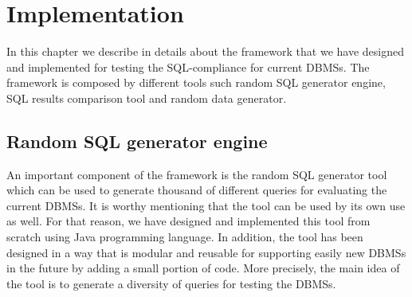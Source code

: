 \chapter{Implementation}
In this chapter we describe in details about the framework that we have designed and implemented for testing the SQL-compliance for current DBMSs. The framework is composed by different tools such random SQL generator engine, SQL results comparison tool and random data generator. 

\section{Random SQL generator engine}
An important component of the framework is the random SQL generator tool which can be used to generate thousand of different queries for evaluating the current DBMSs. It is worthy mentioning that the tool can be used by its own use as well. For that reason, we have designed and implemented this tool from scratch using Java programming language. In addition, the tool has been designed in a way that is modular and reusable for supporting easily new DBMSs in the future by adding a small portion of code. More precisely, the main idea of the tool is to generate a diversity of queries for testing the DBMSs.   

